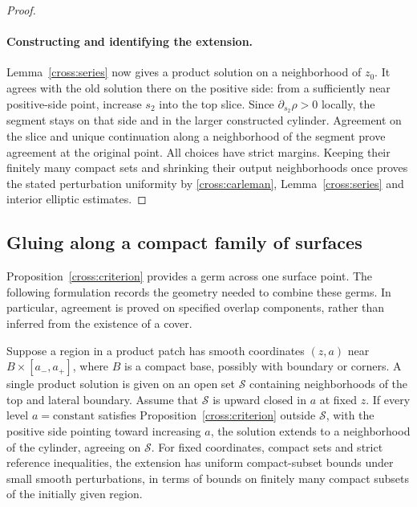 \begin{proof}
\paragraph{Constructing and identifying the extension.}
Lemma~\ref{cross:series} now gives a product solution on a neighborhood
of $z_0$. It agrees with the old solution there on the positive side:
from a sufficiently near positive-side point, increase $s_2$ into
the top slice.  Since $\partial_{s_2}\rho>0$ locally, the segment stays
on that side and in the larger constructed cylinder.  Agreement on
the slice and unique continuation along a neighborhood of the segment
prove agreement at the original point.
All choices have strict margins.  Keeping their finitely many compact
sets and shrinking their output neighborhoods once proves the stated
perturbation uniformity by \eqref{cross:carleman},
Lemma~\ref{cross:series} and interior elliptic estimates.
\end{proof}

\subsection{Gluing along a compact family of surfaces}

Proposition~\ref{cross:criterion} provides a germ across one surface
point.  The following formulation records the geometry needed to
combine these germs.  In particular, agreement is proved on specified
overlap components, rather than inferred from the existence of a cover.

\begin{lemma}
\label{cross:propagation}
Suppose a region in a product patch has smooth coordinates $(z,a)$
near $B\times[a_-,a_+]$, where $B$ is a compact base, possibly with
boundary or corners.  A single product solution is given on an open set $\mathcal S$ containing
neighborhoods of the top and lateral boundary.
Assume that $\mathcal S$ is upward closed in $a$ at fixed $z$.  If every level $a=\text{constant}$
satisfies Proposition~\ref{cross:criterion} outside $\mathcal S$, with
the positive side pointing toward increasing $a$, the solution extends
to a neighborhood of the cylinder, agreeing on $\mathcal S$.
For fixed coordinates, compact sets and strict reference inequalities,
the extension has uniform compact-subset bounds under small smooth
perturbations, in terms of bounds on finitely many compact subsets of
the initially given region.
\end{lemma}

